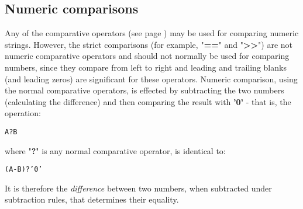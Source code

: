 \subsection{Numeric comparisons}\label{arithnumericcomparisons}
 Any of the  comparative operators (see page \pageref{refcomps})  may be used
for comparing numeric strings.
However, the strict comparisons (for example, "\textbf{==}" and
"\textbf{>>}") are not numeric comparative operators and should
not normally be used for comparing numbers, since they compare from left
to right and leading and trailing blanks (and leading zeros) are
significant for these operators.
 Numeric comparison, using the normal comparative operators, is
effected by subtracting the two numbers (calculating the difference) and
then comparing the result with \textbf{'0'} - that is, the
operation:
\begin{alltt}
A ? B
\end{alltt}
where "\textbf{?}" is any normal comparative operator, is
identical to:
\begin{alltt}
(A - B) ? '0'
\end{alltt}
It is therefore the \emph{difference} between two numbers, when
subtracted under \nr{} subtraction rules, that determines their equality.
